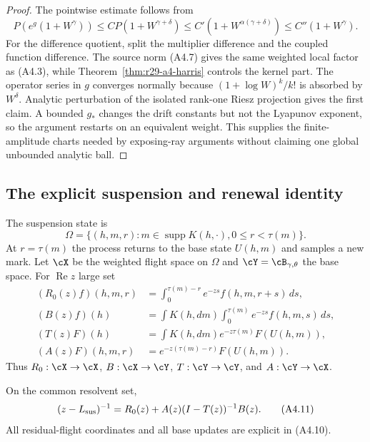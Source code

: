 \begin{proof}
The pointwise estimate follows from
\[
 P(e^{g}(1+W^\gamma))
 \le C P(1+W^{\gamma+\delta})
 \le C'(1+W^{\alpha(\gamma+\delta)})
 \le C''(1+W^\gamma).
\]
For the difference quotient, split the multiplier difference and the coupled
function difference.  The source norm (A4.7) gives the same weighted local
factor as (A4.3), while Theorem~\ref{thm:r29-a4-harris} controls the kernel
part.  The operator series in $g$ converges normally because
$(1+\log W)^k/k!$ is absorbed by $W^\delta$.  Analytic perturbation of the
isolated rank-one Riesz projection gives the first claim.  A bounded $g_*$
changes the drift constants but not the Lyapunov exponent, so the argument
restarts on an equivalent weight.  This supplies the finite-amplitude charts
needed by exposing-ray arguments without claiming one global unbounded
analytic ball.
\end{proof}

\subsection{The explicit suspension and renewal identity}

The suspension state is
\[
 \Omega=\{(h,m,r):m\in\operatorname{supp}K(h,\cdot),
                       0\le r<\tau(m)\}.                  \tag{A4.9}
\]
At $r=\tau(m)$ the process returns to the base state $U(h,m)$ and samples a
new mark.  Let $\cX$ be the weighted flight space on $\Omega$ and
$\cY=\cB_{\gamma,\theta}$ the base space.  For $\operatorname{Re}z$ large set
\begin{equation}\tag{A4.10}
\begin{split}
 (R_0(z)f)(h,m,r)&=\int_0^{\tau(m)-r}e^{-zs}f(h,m,r+s)\,ds,\\
 (B(z)f)(h)&=\int K(h,dm)\int_0^{\tau(m)}e^{-zs}f(h,m,s)\,ds,\\
 (T(z)F)(h)&=\int K(h,dm)e^{-z\tau(m)}F(U(h,m)),\\
 (A(z)F)(h,m,r)&=e^{-z(\tau(m)-r)}F(U(h,m)).
\end{split}
\end{equation}
Thus
$R_0:\cX\to\cX$, $B:\cX\to\cY$, $T:\cY\to\cY$, and
$A:\cY\to\cX$.

\begin{proposition}
\label{prop:r29-a4-renewal}
On the common resolvent set,
\[
 (z-L_{\rm sus})^{-1}
 =R_0(z)+A(z)(I-T(z))^{-1}B(z).                           \tag{A4.11}
\]
All residual-flight coordinates and all base updates are explicit in
(A4.10).
\end{proposition}

